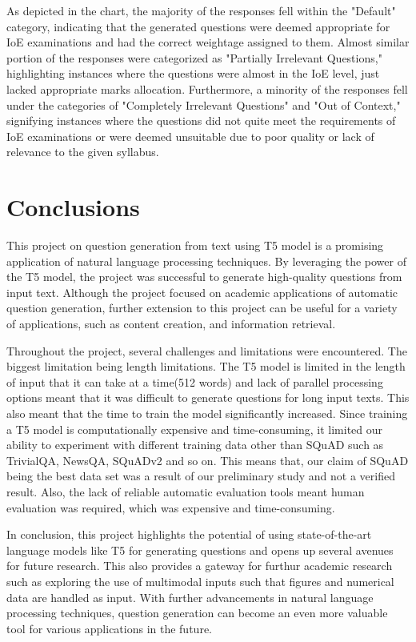 \documentclass[12pt]{report}
\begin{document}
As depicted in the chart, the majority of the responses fell within the "Default" category, indicating that the generated questions were deemed appropriate for IoE examinations and had the correct weightage assigned to them. Almost similar portion of the responses were categorized as "Partially Irrelevant Questions," highlighting instances where the questions were almost in the IoE level, just lacked appropriate marks allocation. Furthermore, a minority of the responses fell under the categories of "Completely Irrelevant Questions" and "Out of Context," signifying instances where the questions did not quite meet the requirements of IoE examinations or were deemed unsuitable due to poor quality or lack of relevance to the given syllabus.




\chapter{Conclusions}
This project on question generation from text using T5 model is a promising application of natural language processing techniques. By leveraging the power of the T5 model, the project was successful to generate high-quality questions from input text. Although the project focused on academic applications of automatic question generation, further extension to this project  can be useful for a variety of applications, such as content creation, and information retrieval.

Throughout the project, several challenges and limitations were encountered. The biggest limitation being length limitations. The T5 model is limited in the length of input that it can take at a time(512 words) and lack of parallel processing options meant that it was difficult to generate questions for long input texts. This also meant that the time to train the model significantly increased. Since training a T5 model is computationally expensive and time-consuming, it limited our ability to experiment with different training data other than SQuAD such as TrivialQA, NewsQA, SQuADv2 and so on. This means that, our claim of SQuAD being the best data set was a result of our preliminary study and not a verified result.  Also, the lack of reliable automatic evaluation tools meant  human evaluation was required, which was expensive and time-consuming.

In conclusion, this project highlights the potential of using state-of-the-art language models like T5 for generating questions and opens up several avenues for future research. This also provides a gateway for furthur academic research such as exploring the use of multimodal inputs such that figures and numerical data are handled as input.  With further advancements in natural language processing techniques, question generation can become an even more valuable tool for various applications in the future.
\end{document}
